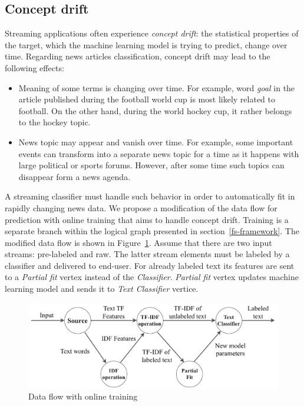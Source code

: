 \subsection{Concept drift}

Streaming applications often experience {\em concept drift}: the statistical properties of the target, which the machine learning model is trying to predict, change over time. Regarding news articles classification, concept drift may lead to the following effects:

\begin{itemize}
    \item Meaning of some terms is changing over time. For example, word {\em goal} in the article published during the football world cup is most likely related to football. On the other hand, during the world hockey cup, it rather belongs to the hockey topic.
    \item News topic may appear and vanish over time. For example, some important events can transform into a separate news topic for a time as it happens with large political or sports forums. However, after some time such topics can disappear form a news agenda.
\end{itemize}

A streaming classifier must handle such behavior in order to automatically fit in rapidly changing news data. We propose a modification of the data flow for prediction with online training that aims to handle concept drift. Training is a separate branch within the logical graph presented in section~\ref{fs-framework}. The modified data flow is shown in Figure~\ref{training_graph}. Assume that there are two input streams: pre-labeled and raw. The latter stream elements must be labeled by a classifier and delivered to end-user. For already labeled text its features are sent to a {\em Partial fit} vertex instead of the {\em Classifier}. {\em Partial fit} vertex updates machine learning model and sends it to {\em Text Classifier} vertice.

\begin{figure}[htbp]
  \centering
  \includegraphics[scale=0.44]{pics/logical-graph}
  \caption{Data flow with online training}
  \label {training_graph}
\end{figure}


